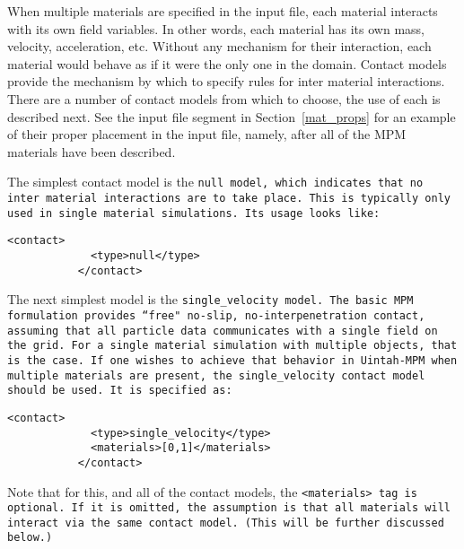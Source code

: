 When multiple materials are specified in the input file, each material
interacts with its own field variables.  In other words, each material has
its own mass, velocity, acceleration, etc.  Without any mechanism for their
interaction, each material would behave as if it were the only one in the
domain.  Contact models provide the mechanism by which to specify rules
for inter material interactions.  There are a number of contact models
from which to choose, the use of each is described next.  See the input
file segment in Section~\ref{mat_props} for an example of their proper
placement in the input file, namely, after all of the MPM materials have
been described.

The simplest contact model is the \tt null \normalfont model, which indicates
that no inter material interactions are to take place.  This is typically only
used in single material simulations.  Its usage looks like:

\begin{Verbatim}[fontsize=\footnotesize]
           <contact>
             <type>null</type>
           </contact>
\end{Verbatim}

The next simplest model is the \tt single\_velocity \normalfont model.
The basic MPM formulation provides ``free" no-slip, no-interpenetration
contact, assuming that all particle data communicates with a single field
on the grid.  For a single material simulation with multiple objects, that
is the case.  If one wishes to achieve that behavior in Uintah-MPM when
multiple materials are present, the \tt single\_velocity \normalfont contact
model should be used.  It is specified as:

\begin{Verbatim}[fontsize=\footnotesize]
           <contact>
             <type>single_velocity</type>
             <materials>[0,1]</materials>
           </contact>
\end{Verbatim}
Note that for this, and all of the contact models,
the \tt <materials> \normalfont tag is optional.  If it is omitted,
the assumption is that all materials will interact via the same contact model.
(This will be further discussed below.)

